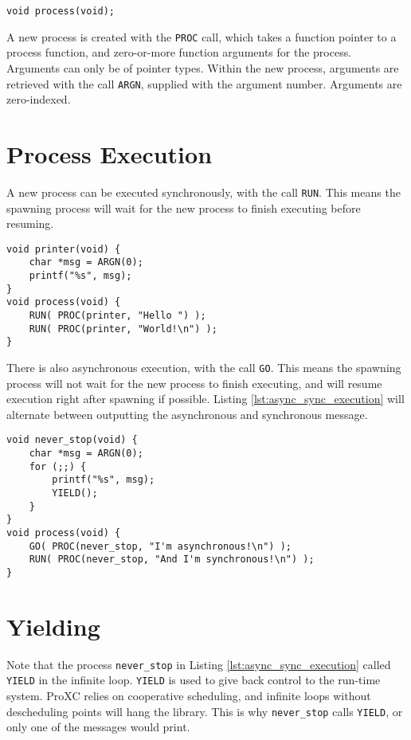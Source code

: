 \begin{lstlisting}[style={CustomC},frame={},numbers={none}]
void process(void);
\end{lstlisting}

A new process is created with the \texttt{PROC} call, which takes a function pointer to a process function, and zero\hyp{}or\hyp{}more function arguments for the process. Arguments can only be of pointer types. Within the new process, arguments are retrieved with the call \texttt{ARGN}, supplied with the argument number. Arguments are zero\hyp{}indexed. 

\section*{Process Execution}

A new process can be executed synchronously, with the call \texttt{RUN}. This means the spawning process will wait for the new process to finish executing before resuming.

\begin{lstlisting}[style={CustomC},caption={Hello World with multiple processes}]
void printer(void) {
    char *msg = ARGN(0);
    printf("%s", msg);
}
void process(void) {
    RUN( PROC(printer, "Hello ") );
    RUN( PROC(printer, "World!\n") );
}
\end{lstlisting}

There is also asynchronous execution, with the call \texttt{GO}. This means the spawning process will not wait for the new process to finish executing, and will resume execution right after spawning if possible. Listing \ref{lst:async_sync_execution} will alternate between outputting the asynchronous and synchronous message.

\begin{lstlisting}[style={CustomC},caption={Asynchronous and synchronous execution},label={lst:async_sync_execution}]
void never_stop(void) {
    char *msg = ARGN(0);
    for (;;) {
        printf("%s", msg);
        YIELD();
    }
}
void process(void) {
    GO( PROC(never_stop, "I'm asynchronous!\n") );
    RUN( PROC(never_stop, "And I'm synchronous!\n") );
}
\end{lstlisting}

\section*{Yielding}

Note that the process \texttt{never\_stop} in Listing \ref{lst:async_sync_execution} called \texttt{YIELD} in the infinite loop. \texttt{YIELD} is used to give back control to the run\hyp{}time system. ProXC relies on cooperative scheduling, and infinite loops without descheduling points will hang the library. This is why \texttt{never\_stop} calls \texttt{YIELD}, or only one of the messages would print. 

